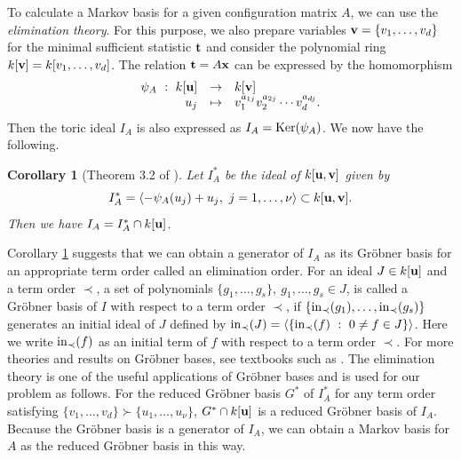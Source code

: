 \documentclass[12pt]{article}
\newtheorem{Corollary}[Theorem]{Corollary}
\theoremstyle{definition}
\def\Bt{{\bf t}}
\def\Bx{{\bf x}}
\def\Bu{{\bf u}}
\def\Bv{{\bf v}}
\def\Bt{{\bf t}}
\begin{document}
To calculate a Markov basis for a given configuration matrix $A$, 
we can use the {\it elimination theory}. For this purpose, we also
prepare variables $\Bv = \{v_1,\ldots,v_{d}\}$ for the minimal
sufficient statistic $\Bt$ and consider the polynomial ring
$k[\Bv] = k[v_1,\ldots,v_{d}]$. The relation $\Bt = A\Bx$ can be
expressed by the homomorphism
\[\begin{array}{rcl}
\psi_A\ :\ k[\Bu] & \rightarrow & k[\Bv]\\
u_j & \mapsto & v_1^{a_{1j}}v_2^{a_{2j}}\cdots v_{d}^{a_{dj}}.
\end{array}
\]
Then the toric ideal $I_A$ is also expressed as $I_A = {\rm
	     Ker}(\psi_A)$.
We now have the following. 
\begin{Corollary}[Theorem 3.2 of \cite{Diaconis-Sturmfels-1998}]
\label{cor:elim-thm}
Let $I_A^{*}$ be the ideal of $k[\Bu, \Bv]$ given by
\[
 I_A^{*} = \left<-\psi_A(u_j) + u_j,\ j = 1,\ldots,\nu \right> \subset
	     k[\Bu, \Bv].
\]
Then we have $I_A = I_A^{*} \cap k[\Bu]$.
\end{Corollary}
Corollary \ref{cor:elim-thm} suggests that we can obtain a generator of
$I_A$ as its Gr\"obner basis for an appropriate term order called an
elimination order. 
For an ideal $J \in k[\Bu]$ and a term order $\prec$, a set of
polynomials $\{g_1,\ldots,g_s\},\ g_1,\ldots,g_s \in J$, is called a 
 Gr\"obner basis of $I$ with respect to a term order $\prec$, if
 $\{{\rm in}_{\prec}(g_1), \ldots, {\rm in}_{\prec}(g_s)\}$ generates 
an initial ideal of $J$ defined by ${\rm in}_{\prec}(J) = \left<\{{\rm
in}_{\prec}(f)\ :\ 0 \neq f \in J\}\right>$. Here we write ${\rm
in}_{\prec}(f)$ as an initial term of $f$ with respect to a term order
$\prec$. For more theories and results on Gr\"obner bases, see textbooks
such as \cite{Cox-Little-Oshea}. The elimination theory is one of the
useful applications of Gr\"obner bases and is used for our problem as follows. 
For the reduced Gr\"obner basis $G^*$ of
	     $I_A^*$ for any term order satisfying $\{v_1,\ldots,v_d\} \succ
	     \{u_1,\ldots,u_{\nu}\}$, $G^{*} \cap k[\Bu]$ is a reduced
	     Gr\"obner basis of $I_A$. Because the Gr\"obner basis is a
 generator of $I_A$, we can obtain a Markov basis for $A$ as the reduced
 Gr\"obner basis in this way.
\end{document}
